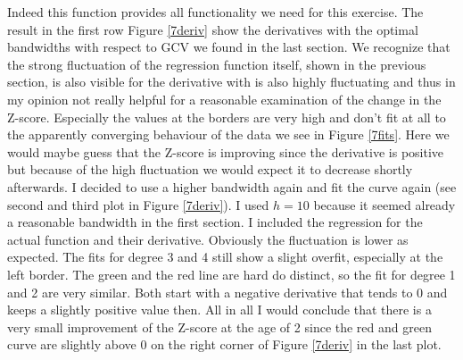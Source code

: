 Indeed this function provides all functionality we need for this exercise. The result in the first row Figure \ref{7deriv} show the derivatives with the optimal bandwidths with respect to GCV we found in the last section. We recognize that the strong fluctuation of the regression function itself, shown in the previous section, is also visible for the derivative with is also highly fluctuating and thus in my opinion not really helpful for a reasonable examination of the change in the Z-score. Especially the values at the borders are very high and don't fit at all to the apparently converging behaviour of the data we see in Figure \ref{7fits}. Here we would maybe guess that the Z-score is improving since the derivative is positive but because of the high fluctuation we would expect it to decrease shortly afterwards. I decided to use a higher bandwidth again and fit the curve again (see second and third plot in Figure \ref{7deriv}). I used $h=10$ because it seemed already a reasonable bandwidth in the first section. I included the regression for the actual function and their derivative. Obviously the fluctuation is lower as expected. The fits for degree 3 and 4 still show a slight overfit, especially at the left border. The green and the red line are hard do distinct, so the fit for degree 1 and 2 are very similar. Both start with a negative derivative that tends to 0 and keeps a slightly positive value then. All in all I would conclude that there is a very small improvement of the Z-score at the age of 2 since the red and green curve are slightly above 0 on the right corner of Figure \ref{7deriv} in the last plot. 
